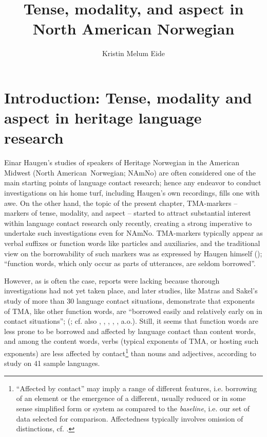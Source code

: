 \documentclass[output=paper]{langscibook}
\author{Kristin Melum Eide\orcid{}\affiliation{NTNU – Norwegian University of Science and Technology \& University of Bergen}}
\title{Tense, modality, and aspect in North American Norwegian}
\begin{document}
\maketitle 

\section{Introduction: Tense, modality and aspect in heritage language research}\label{sec:eide:1}

Einar Haugen’s studies of speakers of Heritage Norwegian in the American Midwest (North American~Norwegian; NAmNo) are often considered one of the main starting points of language contact research; hence any endeavor to conduct investigations on his home turf, including Haugen’s own recordings, fills one with awe. On the other hand, the topic of the present chapter, TMA-markers – markers of tense, modality, and aspect – started to attract substantial interest within language contact research only recently, creating a strong imperative to undertake such investigations even for NAmNo. TMA-markers typically appear as verbal suffixes or function words like particles and auxiliaries, and the traditional view on the borrowability of such markers was as expressed by Haugen himself (\citeyear[67]{Haugen1956}); “function words, which only occur as parts of utterances, are seldom borrowed”.

However, as is often the case, reports were lacking because thorough investigations had not yet taken place, and later studies, like Matras and Sakel’s study of  more than 30 language contact situations, demonstrate that exponents of TMA, like other function words, are “borrowed easily and relatively early on in contact situations”; (\citealt[24]{Sakel2007}; cf. also \citealt{Oestman1981}, \citealt{Salmons1990}, \citealt{BoasWeilbacher2007}, \citealt{Matras2009}, \citealt{Matras2011}, a.o.). Still, it seems that function words are less prone to be borrowed and affected by language contact than content words, and among the content words, verbs (typical exponents of TMA, or hosting such exponents) are less affected by contact\footnote{“Affected by contact” may imply a range of different features, i.e. borrowing of an element or the emergence of a different, usually reduced or in some sense simplified form or system as compared to the \textit{baseline}, i.e. our set of data selected for comparison. Affectedness typically involves omission of distinctions, cf. .} than nouns and adjectives, according to  study on 41 sample languages. 
\end{document}
